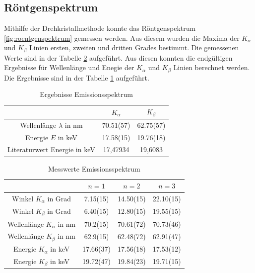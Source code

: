 \documentclass[11pt, a4paper]{article}
\begin{document}
    \subsection{Röntgenspektrum} \FloatBarrier

    Mithilfe der Drehkristallmethode konnte das Röntgenspektrum \ref{fig:roentgenspektrum} gemessen werden. Aus diesem wurden die Maxima der $K_{\alpha}$ und $K_{\beta}$ Linien ersten, zweiten und dritten Grades bestimmt. Die gemessenen Werte sind in der Tabelle \ref{tab:roentgenspektrum} aufgeführt. Aus diesen konnten die endgültigen Ergebnisse für Wellenlänge und Enegie der $K_{\alpha}$ und $K_{\beta}$ Linien berechnet werden. Die Ergebnisse sind in der Tabelle \ref{tab:linienerg} aufgeführt.

    \begin{table}
        \centering
        \caption{Ergebnisse Emissionsspektrum}
        \label{tab:linienerg}
        \begin{tabular}{c|c|c}
            & $K_{\alpha}$ & $K_{\beta}$ \\
            \hline
            Wellenlänge $\lambda$ in nm & 70.51(57) & 62.75(57) \\
            Energie $E$ in keV & 17.58(15) & 19.76(18) \\
            Literaturwert Energie \cite{lin} in keV & 17,47934 & 19,6083
        \end{tabular}
    \end{table}

    \begin{table}[h]
        \centering
        \label{tab:roentgenspektrum}
        \begin{tabular}{c|c|c|c}
        & \textbf{$n = 1$} & \textbf{$n = 2$} & \textbf{$n = 3$} \\ 
        \hline
        Winkel $K_{\alpha}$ in Grad & 7.15(15) & 14.50(15) & 22.10(15)\\ 
        Winkel $K_{\beta}$ in Grad & 6.40(15) & 12.80(15) & 19.55(15)\\ 
        Wellenlänge $K_{\alpha}$ in nm & 70.2(15) & 70.61(72) & 70.73(46) \\ 
        Wellenlänge $K_{\beta}$ in nm & 62.9(15) & 62.48(72) & 62.91(47)\\ 
        Energie $K_{\alpha}$ in keV & 17.66(37) & 17.56(18) & 17.53(12)\\ 
        Energie $K_{\beta}$ in keV & 19.72(47) & 19.84(23) & 19.71(15)\\ 
        \end{tabular}
        \caption{Messwerte Emissionsspektrum}
    \end{table}
\end{document}

